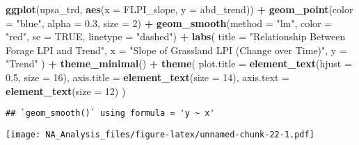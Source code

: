 \documentclass[
]{article}
\newenvironment{Shaded}{\begin{snugshade}}{\end{snugshade}}
\newcommand{\AttributeTok}[1]{\textcolor[rgb]{0.13,0.29,0.53}{#1}}
\newcommand{\ConstantTok}[1]{\textcolor[rgb]{0.56,0.35,0.01}{#1}}
\newcommand{\DecValTok}[1]{\textcolor[rgb]{0.00,0.00,0.81}{#1}}
\newcommand{\FloatTok}[1]{\textcolor[rgb]{0.00,0.00,0.81}{#1}}
\newcommand{\FunctionTok}[1]{\textcolor[rgb]{0.13,0.29,0.53}{\textbf{#1}}}
\newcommand{\NormalTok}[1]{#1}
\newcommand{\SpecialCharTok}[1]{\textcolor[rgb]{0.81,0.36,0.00}{\textbf{#1}}}
\newcommand{\StringTok}[1]{\textcolor[rgb]{0.31,0.60,0.02}{#1}}
\begin{document}
\begin{Shaded}
\begin{Highlighting}[]
\FunctionTok{ggplot}\NormalTok{(upsa\_trd, }\FunctionTok{aes}\NormalTok{(}\AttributeTok{x =}\NormalTok{ FLPI\_slope, }\AttributeTok{y =}\NormalTok{ abd\_trend)) }\SpecialCharTok{+}
  \FunctionTok{geom\_point}\NormalTok{(}\AttributeTok{color =} \StringTok{"blue"}\NormalTok{, }\AttributeTok{alpha =} \FloatTok{0.3}\NormalTok{, }\AttributeTok{size =} \DecValTok{2}\NormalTok{) }\SpecialCharTok{+}  
  \FunctionTok{geom\_smooth}\NormalTok{(}\AttributeTok{method =} \StringTok{"lm"}\NormalTok{, }\AttributeTok{color =} \StringTok{"red"}\NormalTok{, }\AttributeTok{se =} \ConstantTok{TRUE}\NormalTok{, }\AttributeTok{linetype =} \StringTok{"dashed"}\NormalTok{) }\SpecialCharTok{+} 
  \FunctionTok{labs}\NormalTok{(}
    \AttributeTok{title =} \StringTok{"Relationship Between Forage LPI and Trend"}\NormalTok{,}
    \AttributeTok{x =} \StringTok{"Slope of Grassland LPI (Change over Time)"}\NormalTok{,}
    \AttributeTok{y =} \StringTok{"Trend"}
\NormalTok{  ) }\SpecialCharTok{+}
  \FunctionTok{theme\_minimal}\NormalTok{() }\SpecialCharTok{+}
  \FunctionTok{theme}\NormalTok{(}
    \AttributeTok{plot.title =} \FunctionTok{element\_text}\NormalTok{(}\AttributeTok{hjust =} \FloatTok{0.5}\NormalTok{, }\AttributeTok{size =} \DecValTok{16}\NormalTok{),}
    \AttributeTok{axis.title =} \FunctionTok{element\_text}\NormalTok{(}\AttributeTok{size =} \DecValTok{14}\NormalTok{),}
    \AttributeTok{axis.text =} \FunctionTok{element\_text}\NormalTok{(}\AttributeTok{size =} \DecValTok{12}\NormalTok{)}
\NormalTok{  )}
\end{Highlighting}
\end{Shaded}

\begin{verbatim}
## `geom_smooth()` using formula = 'y ~ x'
\end{verbatim}

\texttt{[image: NA\_Analysis\_files/figure-latex/unnamed-chunk-22-1.pdf]}
\end{document}
